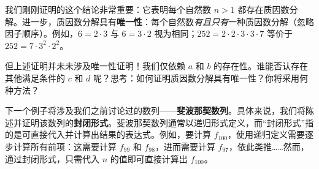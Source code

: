 我们刚刚证明的这个结论非常重要：它表明每个自然数 $n > 1$ 都存在质因数分解。进一步，质因数分解具有\textbf{唯一性}：每个自然数\emph{有且只有}一种质因数分解（忽略因子顺序）。例如，$6 = 2 \cdot 3$ 与 $6 = 3 \cdot 2$ 视为相同；$252 = 2 \cdot 2 \cdot 3 \cdot 3 \cdot 7$ 等价于 $252 = 7 \cdot 3^2 \cdot 2^2$。

但上述证明并未未涉及唯一性证明！我们仅依赖 $a$ 和 $b$ 的存在性。谁能否认存在其他满足条件的 $c$ 和 $d$ 呢？思考：如何证明质因数分解具有唯一性？你将采用何种方法？

下一个例子将涉及我们之前讨论过的数列——\textbf{斐波那契数列}。具体来说，我们将陈述并证明该数列的\textbf{封闭形式}。斐波那契数列通常以递归形式定义，而``封闭形式''指的是可直接代入并计算出结果的表达式。例如，要计算 $f_{100}$，使用递归定义需要逐步计算所有前项：这需要计算 $f_{99}$ 和 $f_{98}$，进而需要计算 $f_{97}$，依此类推……然而，通过封闭形式，只需代入 $n$ 的值即可直接计算出 $f_{100}$。

